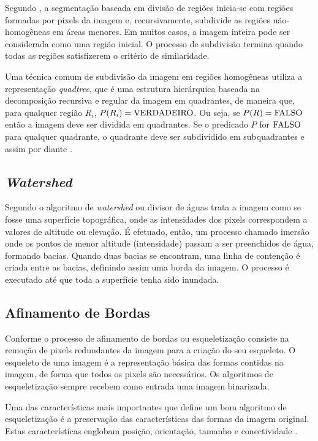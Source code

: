 \documentclass[12pt,oneside,a4paper,english,french,spanish,brazil,]{abntex2}
\begin{document}
Segundo \citet{pedrini:2008}, a segmentação baseada em divisão de regiões inicia-se com regiões formadas por pixels da imagem e, recursivamente, subdivide as regiões não-homogêneas em áreas menores. Em muitos casos, a imagem inteira pode ser considerada como uma região inicial. O processo de subdivisão termina quando todas as regiões satisfizerem o critério de similaridade.

Uma técnica comum de subdivisão da imagem em regiões homogêneas utiliza a representação \textit{quadtree}, que é uma estrutura hierárquica baseada na decomposição recursiva e regular da imagem em quadrantes, de maneira que, para qualquer região \(R_i\), \(P(R_i) = \textup{VERDADEIRO}\). Ou seja, se \(P(R) = \textup{FALSO}\) então a imagem deve ser dividida em quadrantes. Se o predicado \(P\) for \(\textup{FALSO}\) para qualquer quadrante, o quadrante deve ser subdividido em subquadrantes e assim por diante \cite{pedrini:2008}.

\subsection{\textit{Watershed}}

Segundo \citet{pedrini:2008} o algoritmo de \textit{watershed} ou divisor de águas trata a imagem como se fosse uma superfície topográfica, onde as intensidades dos pixels correspondem a valores de altitude ou elevação. É efetuado, então, um processo chamado imersão onde os pontos de menor altitude (intensidade) passam a ser preenchidos de água, formando bacias. Quando duas bacias se encontram, uma linha de contenção é criada entre as bacias, definindo assim uma borda da imagem. O processo é executado até que toda a superfície tenha sido inundada.

\subsection{Afinamento de Bordas}

Conforme \citet{guilherme:2007} o processo de afinamento de bordas ou esqueletização consiste na remoção de pixels redundantes da imagem para a criação do seu esqueleto. O esqueleto de uma imagem é a representação básica das formas contidas na imagem, de forma que todos os pixels são necessários. Os algoritmos de esqueletização sempre recebem como entrada uma imagem binarizada.

Uma das características mais importantes que define um bom algoritmo de esqueletização é a preservação das características das formas da imagem original. Estas características englobam posição, orientação, tamanho e conectividade \cite{guilherme:2007}.
\end{document}
